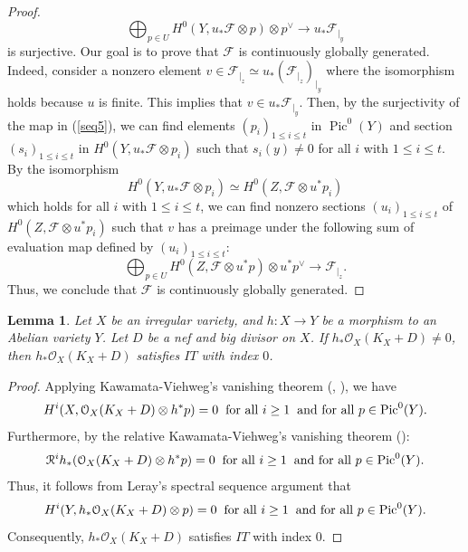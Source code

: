 \documentclass[sn-mathphys-num]{sn-jnl}%
\newtheorem{lemma}[theorem]{Lemma}
\theoremstyle{definition}
\numberwithin{equation}{section}
\begin{document}
\begin{proof}
\begin{equation}\label{seq5}
\bigoplus_{p \in U} H^{0}(Y, u_{*}\mathcal{F}\otimes p) \otimes p^{\vee} \to u_{*}\mathcal{F}_{|_{y}}
\end{equation}
is surjective. Our goal is to prove that $\mathcal{F}$ is continuously globally generated. Indeed, consider a nonzero element $v \in \mathcal{F}_{|_{z}} \simeq u_{*}(\mathcal{F}_{|_{z}})_{|_{y}}$ where the isomorphism holds because $u$ is finite. This implies that $v \in u_{*}\mathcal{F}_{|_{y}}$. Then, by the surjectivity of the map in (\ref{seq5}), we can find  elements $(p_{i})_{1 \leq i \leq t}$ in $\operatorname{Pic}^{0}(Y)$ and section $(s_{i})_{1\leq i \leq t}$ in $H^{0}(Y, u_{*}\mathcal{F} \otimes p_{i})$ such that $s_{i}(y) \neq 0$ for all $i$ with  $1 \leq i \leq t$. By the isomorphism $$H^{0}(Y, u_{*}\mathcal{F}\otimes p_{i}) \simeq H^{0}(Z, \mathcal{F} \otimes u^{*}p_{i}) $$
which holds for all $i$ with $1 \leq i \leq t$, we can find nonzero sections  $(u_{i})_{1\leq i \leq t}$  of $H^{0}(Z, \mathcal{F} \otimes u^{*}p_{i})$
such that $v$ has a preimage under the following sum of evaluation map  defined by $(u_{i})_{1\leq i \leq t}$:
\begin{equation}\label{seq6}
\bigoplus_{p \in U} H^{0}(Z, \mathcal{F}\otimes u^{*}p) \otimes u^{*}p^{\vee} \to \mathcal{F}_{|_{z}} \text{.}
\end{equation}
Thus, we conclude that $\mathcal{F}$ is continuously globally generated.
\end{proof}
\begin{lemma}\label{lemma3}
Let $X$ be an irregular variety, and $h:X \to Y$ be a morphism to an Abelian variety $Y$. Let $D$ be a nef and big divisor on $X$. If $h_{*}\mathcal{O}_{X}(K_{X} +D) \neq 0$, then $h_{*}\mathcal{O}_{X}(K_{X} +D)$ satisfies $IT$ with index $0$.
\end{lemma}
\begin{proof}
Applying Kawamata-Viehweg's vanishing theorem (\cite[Theorem 1]{kawamata-viehweg}, \cite[Corollary 0.3]{viehwegvanishing}), we have  $$H^{i}(X, \mathcal{O}_{X}(K_{X} +D) \otimes h^{*}p) = 0 \hspace{0.2cm} \text{for all } i\geq 1 \hspace{0.2cm} \text{and for all }  p \in \operatorname{Pic}^{0}(Y) \text{.}$$
Furthermore, by the relative Kawamata-Viehweg's vanishing theorem (\cite[Theorem 2.2.1]{BMSA}): $$\mathcal{R}^{i}h_{*}(\mathcal{O}_{X}(K_{X} + D) \otimes h^{*}p) = 0 \hspace{0.2cm} \text{for all } i \geq 1 \hspace{0.2cm} \text{and for all }  p \in \operatorname{Pic}^{0}(Y).$$ Thus, it follows from  Leray's spectral sequence argument that \[
H^{i}(Y, h_{*}\mathcal{O}_{X}(K_{X} + D) \otimes p) = 0 \hspace{0.2cm} \text{for all }  i\geq 1 \hspace{0.2cm} \text{and for all }  p \in  \operatorname{Pic}^{0}(Y)\text{.}
\]
Consequently, $h_{*}\mathcal{O}_{X}(K_{X} +D)$ satisfies $IT$ with index $0$.
\end{proof}
\end{document}
